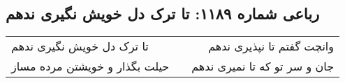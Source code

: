 \begin{center}
\section*{رباعی شماره ۱۱۸۹: تا ترک دل خویش نگیری ندهم}
\label{sec:1189}
\begin{longtable}{l p{0.5cm} r}
تا ترک دل خویش نگیری ندهم
&&
وانچت گفتم تا نپذیری ندهم
\\
حیلت بگذار و خویشتن مرده مساز
&&
جان و سر تو که تا نمیری ندهم
\\
\end{longtable}
\end{center}
